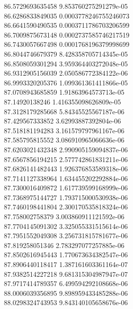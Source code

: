 {86.5729693635458 9.853760275291279e-05 \\
86.6286833849035 0.0003778246755246073 \\
86.6641590490535 0.0003711786703206599 \\
86.7009875673148 0.0002737585746217519 \\
86.7430057667498 0.0001768196379998699 \\
86.8044746679379 8.428358705714345e-05 \\
86.8508059301294 3.959364403272048e-05 \\
86.9312905156039 2.050586772384122e-06 \\
86.9993320205376 1.099361361411866e-05 \\
87.0708943685859 1.91863964573713e-05 \\
87.14920138246 1.416355098626809e-05 \\
87.3128179285668 5.84345525567187e-06 \\
87.429567333852 3.62993887392804e-06 \\
87.518181194283 3.161579797961167e-06 \\
87.585795815552 3.086910965066636e-06 \\
87.6203021432348 2.990905159094837e-06 \\
87.6567856194215 2.577742861831211e-06 \\
87.6826141482443 1.926376853589318e-06 \\
87.7141127338964 1.634455202292884e-06 \\
87.7300016409872 1.617739599168999e-06 \\
87.7368975144727 1.793715000530938e-06 \\
87.7460198441804 2.300170535818324e-06 \\
87.758002758379 3.003860911121592e-06 \\
87.7704145091302 3.325055331515614e-06 \\
87.7951552049308 3.256731815781677e-06 \\
87.819258051346 2.783297077257885e-06 \\
87.8502616945443 1.770673634382547e-06 \\
87.8906440118417 1.387161603361164e-07 \\
87.9382514227218 9.681315304987947e-07 \\
87.9717414789357 6.499594292108668e-06 \\
88.0006039356895 9.898959433485288e-06 \\
88.0298324743953 9.843140105658676e-06 \\
}
